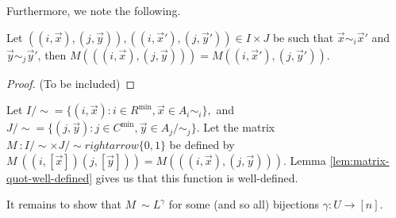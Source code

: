 \documentclass[../paper.tex]{subfiles}
\begin{document}
Furthermore, we note the following.

\begin{lem}
  Let $((i, \vec{x}), (j, \vec{y})), ((i, \vec{x}'), (j, \vec{y}')) \in I \times
  J$ be such that $\vec{x} \sim_i \vec{x}'$ and $\vec{y} \sim_j \vec{y}'$, then
  $M(((i, \vec{x}), (j, \vec{y}))) = M((i, \vec{x}'), (j, \vec{y}'))$.
  \label{lem:matrix-quot-well-defined}
\end{lem}
\begin{proof}
  (To be included)
\end{proof}

Let $I /{\sim} = \{(i, \vec{x}): i \in R^{\min}, \vec{x} \in A_i{\sim_i}\},$ and
$J/{\sim} = \{(j, \vec{y}): j \in C^{\min}, \vec{y} \in A_j/{\sim_j}\}$. Let the
matrix $M_{~} : I /{\sim} \times J / {\sim} rightarrow \{0,1\}$ be defined by
$M_{~} ((i, [\vec{x}]) (j, [\vec{y}])) = M(((i, \vec{x}), (j, \vec{y})))$. Lemma
\ref{lem:matrix-quot-well-defined} gives us that this function is well-defined.

It remains to show that $M_{~} \sim L^{\gamma}$ for some (and so all) bijections
$\gamma: U \rightarrow [n]$.


\end{document}

